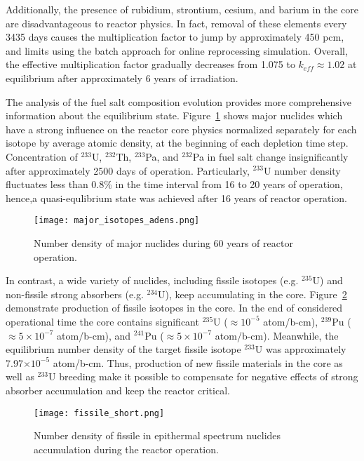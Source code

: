 Additionally, the presence of rubidium, strontium, cesium, and barium in the core are disadvantageous to reactor physics. In fact, removal of these elements every 3435 days causes the multiplication factor to jump by approximately 450 pcm, and limits using the batch approach for online reprocessing simulation. Overall, the effective multiplication factor gradually decreases from 1.075 to $k_{eff} \approx 1.02$ at equilibrium after approximately 6 years of irradiation. 

The analysis of the fuel salt composition evolution provides more comprehensive information about the equilibrium state. Figure~\ref{fig:adens_eq} shows major nuclides which have a strong influence on the reactor core physics normalized separately for each isotope by average atomic density, at the beginning of each depletion time step. Concentration of $^{233}$U, $^{232}$Th, $^{233}$Pa, and $^{232}$Pa in fuel salt change insignificantly after approximately 2500 days of operation. Particularly, $^{233}$U number density fluctuates less than 0.8\% in the time interval from 16 to 20 years of operation, hence,a quasi-equlibrium state was achieved after 16 years of reactor operation.
\begin{figure}[htp!] %
  \centering
  \texttt{[image: major\_isotopes\_adens.png]}
  \caption{Number density of major nuclides during 60 years of reactor operation.}
  \label{fig:adens_eq}
\end{figure}
In contrast, a wide variety of nuclides, including fissile isotopes (e.g. $^{235}$U) and non-fissile strong absorbers (e.g. $^{234}$U), keep accumulating in the core. Figure~\ref{fig:fissile_short} demonstrate production of fissile isotopes in the core. In the end of considered operational time the core contains significant $^{235}$U ($\approx10^{-5}$ atom/b-cm), $^{239}$Pu ($\approx5\times10^{-7}$ atom/b-cm), and $^{241}$Pu ($\approx 5\times10^{-7}$ atom/b-cm). Meanwhile, the equilibrium number density of the target fissile isotope $^{233}$U was approximately 7.97$\times10^{-5}$ atom/b-cm. Thus, production of new fissile materials in the core as well as $^{233}$U breeding make it possible to compensate for negative effects of strong absorber accumulation and keep the reactor critical.
\begin{figure}[htp!] %
  \centering
  \texttt{[image: fissile\_short.png]}
  \caption{Number density of fissile in epithermal spectrum nuclides accumulation during the reactor operation.}
  \label{fig:fissile_short}
\end{figure}
